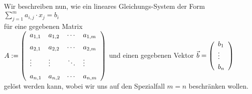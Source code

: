 Wir beschreiben nun, wie ein lineares Gleichungs-System der Form
\\[0.2cm]
\hspace*{1.3cm}
$\sum\limits_{j=1}^m a_{i,j} \cdot x_j = b_i$
\\[0.2cm]
f\"{u}r eine  gegebenen Matrix 
\\[0.2cm]
\hspace*{1.3cm}
$A := \left(
  \begin{array}[c]{ll c l}
    a_{1,1} & a_{1,2} & \cdots & a_{1,m} \\[0.2cm]
    a_{2,1} & a_{2,2} & \cdots & a_{2,m} \\[0.2cm]
    \vdots  & \vdots  & \ddots & \vdots  \\[0.2cm]
    a_{n,1} & a_{n,2} & \cdots & a_{n,m} 
  \end{array}
 \right)
$
\quad und einen gegebenen Vektor \quad
$\vec{b} = \left(
  \begin{array}[c]{l}
     b_1    \\
     \vdots \\[0.1cm]
     b_n       
  \end{array}
 \right)
$
\\[0.2cm]
gel\"{o}st werden kann, wobei wir uns auf den Spezialfall $m=n$ beschr\"{a}nken wollen.
